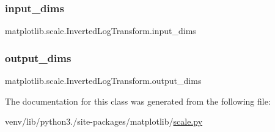 \subsubsection{\texorpdfstring{input\+\_\+dims}{input\_dims}}
{\footnotesize\ttfamily matplotlib.\+scale.\+Inverted\+Log\+Transform.\+input\+\_\+dims\hspace{0.3cm}{\ttfamily [static]}}

\mbox{\label{classmatplotlib_1_1scale_1_1InvertedLogTransform_a1adce13552524b01af88a7dbafa29827}} 
\subsubsection{\texorpdfstring{output\+\_\+dims}{output\_dims}}
{\footnotesize\ttfamily matplotlib.\+scale.\+Inverted\+Log\+Transform.\+output\+\_\+dims\hspace{0.3cm}{\ttfamily [static]}}



The documentation for this class was generated from the following file\+:\begin{DoxyCompactItemize}
\item 
venv/lib/python3./site-\/packages/matplotlib/\hyperlink{scale_8py}{scale.\+py}\end{DoxyCompactItemize}
